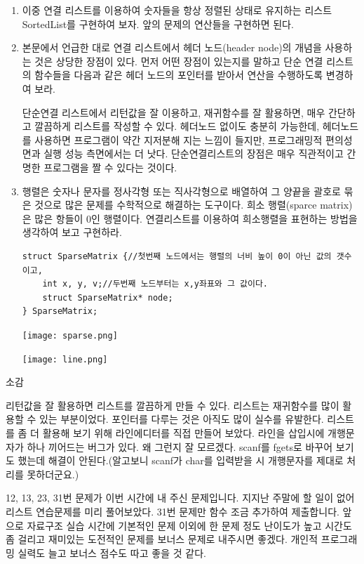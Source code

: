 \documentclass[11pt,a4paper]{article}
\begin{document}
\begin{enumerate}
\item 이중 연결 리스트를 이용하여 숫자들을 항상 정렬된 상태로 유지하는 리스트 SortedList를 구현하여 보자.
앞의 문제의 연산들을 구현하면 된다.


\item 본문에서 언급한 대로 연결 리스트에서 헤더 노드(header node)의 개념을 사용하는 것은 상당한 장점이 있다. 먼저 어떤 장점이 있는지를 말하고 단순 연결 리스트의 함수들을 다음과 같은 헤더 노드의 포인터를 받아서 연산을 수행하도록 변경하여 보라.

단순연결 리스트에서 리턴값을 잘 이용하고, 재귀함수를 잘 활용하면, 매우 간단하고 깔끔하게 리스트를 작성할 수 있다. 헤더노드 없이도 충분히 가능한데, 헤더노드를 사용하면 프로그램이 약간 지저분해 지는 느낌이 들지만, 프로그래밍적 편의성 면과 실행 성능 측면에서는 더 낫다. 단순연결리스트의 장점은 매우 직관적이고 간명한 프로그램을 짤 수 있다는 것이다.
\item 행렬은 숫자나 문자를 정사각형 또는 직사각형으로 배열하여 그 양끝을 괄호로 묶은 것으로 많은 문제를 수학적으로 해결하는 도구이다. 희소 행렬(sparce matrix)은 많은 항들이 0인 행렬이다. 
연결리스트를 이용하여 희소행렬을 표현하는 방법을 생각하여 보고 구현하라.
\begin{lstlisting}
struct SparseMatrix {//첫번째 노드에서는 행렬의 너비 높이 0이 아닌 값의 갯수이고, 
	int x, y, v;//두번째 노드부터는 x,y좌표와 그 값이다.
	struct SparseMatrix* node;
} SparseMatrix;
\end{lstlisting}

\texttt{[image: sparse.png]}

\texttt{[image: line.png]}
\end{enumerate}

\vspace{2cm}
{\Huge 소감}

리턴값을 잘 활용하면 리스트를 깔끔하게 만들 수 있다. 리스트는 재귀함수를 많이 활용할 수 있는 부분이었다. 포인터를 다루는 것은 아직도 많이 실수를 유발한다. 리스트를 좀 더 활용해 보기 위해 라인에디터를 직접 만들어 보았다. 라인을 삽입시에 개행문자가 하나 끼어드는 버그가 있다. 왜 그런지 잘 모르겠다. scanf를 fgets로 바꾸어 보기도 했는데 해결이 안된다.(알고보니 scanf가 char를 입력받을 시 개행문자를 제대로 처리를 못하더군요.)

12, 13, 23, 31번 문제가 이번 시간에 내 주신 문제입니다. 지지난 주말에 할 일이 없어 리스트 연습문제를 미리 풀어보았다. 31번 문제만 함수 조금 추가하여 제출합니다. 앞으로 자료구조 실습 시간에 기본적인 문제 이외에 한 문제 정도 난이도가 높고 시간도 좀 걸리고 재미있는 도전적인 문제를 보너스 문제로 내주시면 좋겠다. 개인적 프로그래밍 실력도 늘고 보너스 점수도 따고 좋을 것 같다. 
\end{document}
